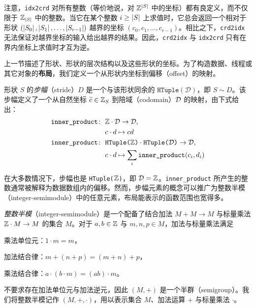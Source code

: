 注意，{\tt idx2crd} 对所有整数（等价地说，对 $\mathbb{Z}^{\left| {S} \right|}$ 中的坐标）都有良定义，而不仅限于 $\mathbb{Z}_{\left| {S} \right|}$ 中的整数。当它在某个整数 $i \geq \left| {S} \right|$ 上求值时，它总会返回一个相对于形状 $(\left| {S_0} \right|,\left| {S_1} \right|,\ldots,\left| {S_{r-1}} \right|)$ 越界的坐标 $(c_0,c_1,\ldots,c_{r-1})$。相比之下，{\tt crd2idx} 无法保证对越界坐标的输入给出越界的结果。因此，{\tt crd2idx} 与 {\tt idx2crd} 只有在界内坐标上求值时才互为逆。

\label{sec:stride}

上一节描述了形状、形状的层次结构以及这些形状的坐标。为了构造数据、线程或其它对象的\textbf{布局}，我们定义一个从形状内坐标到偏移（offset）的映射。

\begin{definition}
形状 $S$ 的\emph{步幅}（stride）$D$ 是一个与该形状同余的 $\texttt{HTuple}(\mathcal{D})$，即 $S \sim D$。该步幅定义了一个从自然坐标 $\widetilde{c} \in \mathbb{Z}_S$ 到陪域（codomain）$\mathcal{D}$ 的映射，由下式给出：
\begin{align}
\texttt{inner\_product} \colon \ &\mathbb{Z} \cdot \mathcal{D} \to \mathcal{D}, \nonumber \\
&c \cdot d \mapsto cd \nonumber\\
\texttt{inner\_product} \colon \ &\texttt{HTuple($\mathbb{Z}$)} \cdot \texttt{HTuple($\mathcal{D}$)} \to \mathcal{D}, \nonumber \\
&c \cdot d \mapsto \sum_i \texttt{inner\_product}(c_i, d_i)
\label{eqn:innerprod}
\end{align}
\end{definition}

在大多数情况下，步幅也是 \texttt{HTuple($\mathbb{Z}$)}，即 $\mathcal{D} = \mathbb{Z}$。\texttt{inner\_product} 所产生的整数通常被解释为数据数组内的偏移。然而，步幅元素的概念可以推广为整数半模（integer-semimodule）中的任意元素，布局能表示的函数范围也宽得多。


\begin{definition}
\emph{整数半模}（integer-semimodule）是一个配备了结合加法 $M + M \to M$ 与标量乘法 $\mathbb{Z} \cdot M \to M$ 的集合 $M$。对于 $a,b \in \mathbb{Z}$ 与 $m,n,p \in M$，加法与标量乘法满足
\begin{compactitem}
\item 乘法单位元：$1 \cdot m = m$，
\item 加法结合律：$m + (n + p) = (m + n) + p$，
\item 乘法结合律：$a \cdot (b \cdot m) = (ab) \cdot m$。
\end{compactitem}
不要求存在加法单位元与加法逆元，因此 $(M,+)$ 是一个半群（semigroup）。我们将整数半模记作 $(M,+,\cdot)$，用以表示集合 $M$、加法运算 $+$ 与标量乘法 $\cdot$。
\end{definition}

